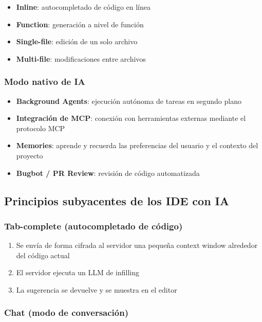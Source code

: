 \begin{itemize}
    \item \textbf{Inline}: autocompletado de código en línea
    \item \textbf{Function}: generación a nivel de función
    \item \textbf{Single-file}: edición de un solo archivo
    \item \textbf{Multi-file}: modificaciones entre archivos
\end{itemize}

\subsubsection{Modo nativo de IA}

\begin{itemize}
    \item \textbf{Background Agents}: ejecución autónoma de tareas en segundo plano
    \item \textbf{Integración de MCP}: conexión con herramientas externas mediante el protocolo MCP
    \item \textbf{Memories}: aprende y recuerda las preferencias del usuario y el contexto del proyecto
    \item \textbf{Bugbot / PR Review}: revisión de código automatizada
\end{itemize}

\subsection{Principios subyacentes de los IDE con IA}

\subsubsection{Tab-complete (autocompletado de código)}

\begin{enumerate}
    \item Se envía de forma cifrada al servidor una pequeña context window alrededor del código actual
    \item El servidor ejecuta un LLM de infilling
    \item La sugerencia se devuelve y se muestra en el editor
\end{enumerate}

\subsubsection{Chat (modo de conversación)}

